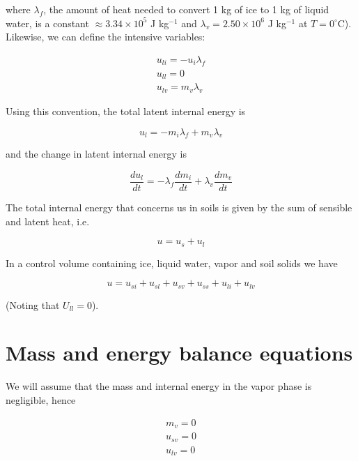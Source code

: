 \documentclass[10pt,a4paper]{article}
\begin{document}
where $\lambda_f$, the amount of heat needed to convert 1 kg of ice to 1 kg of liquid water, is a constant $\approx 3.34\times10^5$ J kg$^{-1}$ and $\lambda_v=2.50\times10^6$ J kg$^{-1}$ at $T=0^\circ$C). Likewise, we can define the intensive variables:

\begin{equation}
	\begin{array}{c}
	u_{li}=-u_i\lambda_f
	\\
	u_{ll}=0
	\\
	u_{lv}=m_v\lambda_v
	\end{array}
\end{equation}

Using this convention, the total latent internal energy is

\begin{equation} \label{eq: u_l_rel}
u_l=-m_i \lambda_f +m_v \lambda_v
\end{equation}

and the change in latent internal energy is

\begin{equation}
\frac{du_l}{dt}=-\lambda_f\frac{dm_i}{dt}+\lambda_v\frac{dm_v}{dt}
\end{equation}

The total internal energy that concerns us in soils is given by the sum of sensible and latent heat, i.e.

\begin{equation}
u=u_s+u_l
\end{equation}

In a control volume containing ice, liquid water, vapor and soil solids we have 

\begin{equation}
u=u_{si}+u_{sl}+u_{sv}+u_{ss}+u_{li}+u_{lv}
\end{equation}

(Noting that $U_{ll}=0$). 

\section{Mass and energy balance equations}

We will assume that the mass and internal energy in the vapor phase is negligible, hence

\begin{equation}
\begin{array}{l}
	m_v=0\\
	u_{sv} = 0\\
	u_{lv} = 0
\end{array}
\end{equation}
\end{document}
